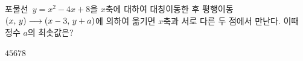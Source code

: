 포물선~$y=x^2-4x+8$을 $x$축에 대하여 대칭이동한 후 평행이동 $(x,\mkern3mu y)\longrightarrow(x-3,\mkern3mu y+a)$에 의하여 옮기면 $x$축과 서로 다른 두 점에서 만난다. 이때 정수 $a$의 최솟값은?
\begin{choices32}{$4$}{$5$}{$6$}{$7$}{$8$}\end{choices32}
